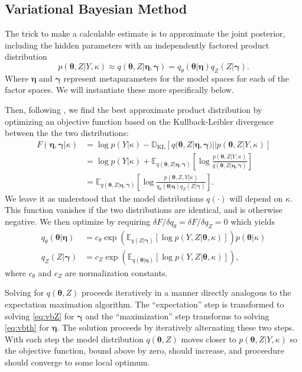 \documentclass[aps,showpacs,twocolumn,prd,superscriptaddress,nofootinbib]{revtex4}
\newcommand{\be}{\begin{equation}}
\newcommand{\ee}{\end{equation}}
\newcommand{\nn}{\nonumber}
\newcommand{\E}[1]{{\mathbb E}_{#1}\!}
\begin{document}
\subsection{Variational Bayesian Method}
The trick to make a calculable estimate is to approximate the joint posterior, including the hidden parameters with an independently factored product distribution
\be
p(\bm\theta,Z|Y,\kappa)\approx q(\bm\theta,Z|\bm\eta,\bm\gamma)=q_\theta(\bm\theta|\bm\eta)q_Z(Z|\bm\gamma).
\ee
Where $\bm\eta$ and $\bm\gamma$ represent metaparameters for the model spaces for each of the factor spaces. We will instantiate these more specifically below.

Then, following \cite{Attias2000}, we find the best approximate product distribution by optimizing an objective function based on the Kullback-Leibler divergence between the the two distributions:
\begin{align}
  F(\bm\eta,\bm\gamma|\kappa)&=\log p(Y|\kappa)-\mathbb{D}_{\mathrm{KL}}\left[q(\bm\theta,Z|\bm\eta,\bm\gamma)||p(\bm\theta,Z|Y,\kappa)\right]\nn\\
  &=\log p(Y|\kappa)+\E{q(\bm\theta,Z|\bm\eta,\bm\gamma)}\left[\log\frac{p(\bm\theta,Z|Y,\kappa)}{q(\bm\theta,Z|\bm\eta,\bm\gamma)}\right]\nn\\
  &=\E{q(\bm\theta,Z|\bm\eta,\bm\gamma)}\left[\log\frac{p(\bm\theta,Z,Y|\kappa)}{q_\theta(\bm\theta|\bm\eta)q_Z(Z|\bm\gamma)}\right].\label{eq:Fdef}
\end{align}
We leave it as understood that the model distributions $q(\cdot)$ will depend on $\kappa$.
This function vanishes if the two distributions are identical, and is otherwise negative. We then optimize by requiring $\delta F/\delta q_\theta=\delta F/\delta q_Z=0$ which yields
\begin{align}
  q_\theta(\bm\theta|\bm\eta)&=c_\theta\exp\left(\E{q(Z|\bm\gamma)}\left[\log p(Y,Z|\bm\theta,\kappa)\right]\right)p(\bm\theta|\kappa)\label{eq:vbth}\\
  q_Z(Z|\bm\gamma)&=c_Z\exp\left(\E{q(\bm\theta|\bm\eta)}\left[\log p(Y,Z|\bm\theta,\kappa)\right]\right),\label{eq:vbZ}
\end{align}
where $c_\theta$ and $c_Z$ are normalization constants. 

Solving for $q(\bm\theta,Z)$ proceeds iteratively in a manner directly analogous to the expectation maximation algorithm.  The ``expectation'' step is transformed to solving \eqref{eq:vbZ} for $\bm\gamma$ and the ``maximization'' step transforms to solving \eqref{eq:vbth} for $\bm\eta$.  The solution proceeds by iteratively alternating these two steps.  With each step the model distribution $q(\bm\theta,Z)$ moves closer to $p(\bm\theta,Z|Y,\kappa)$ so the objective function, bound above by zero, should increase, and proceedure should converge to some local optimum.
\end{document}
